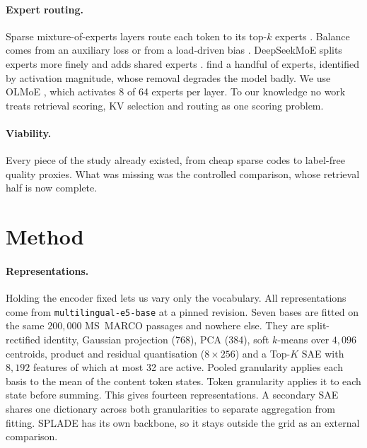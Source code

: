 \documentclass[11pt]{article}
\begin{document}
\paragraph{Expert routing.} Sparse mixture-of-experts layers route each token to its top-$k$
experts \citep{shazeer2017moe,lepikhin2021gshard,fedus2022switch}. Balance comes from an
auxiliary loss \citep{zoph2022stmoe} or from a load-driven bias \citep{wang2024lossfree}.
DeepSeekMoE splits experts more finely and adds shared experts \citep{dai2024deepseekmoe}.
\citet{su2026superexperts} find a handful of experts, identified by activation magnitude,
whose removal degrades the model badly. We use OLMoE \citep{muennighoff2025olmoe}, which
activates 8 of 64 experts per layer. To our knowledge no work treats retrieval scoring,
KV selection and routing as one scoring problem.

\paragraph{Viability.} Every piece of the study already existed, from cheap sparse codes
to label-free quality proxies. What was missing was the controlled comparison, whose
retrieval half is now complete.

\section{Method}
\label{sec:method}

\paragraph{Representations.} Holding the encoder fixed lets us vary only the vocabulary.
All representations come from \texttt{multilingual-e5-base} \citep{wang2024me5} at a
pinned revision. Seven bases are fitted on the same $200{,}000$ MS~MARCO passages
\citep{bajaj2016msmarco} and nowhere else. They are split-rectified identity, Gaussian
projection (768), PCA (384), soft $k$-means over $4{,}096$ centroids, product and residual
quantisation ($8 \times 256$) and a Top-$K$ SAE with $8{,}192$ features of which at most 32
are active. Pooled granularity applies each basis to the mean of the content token
states. Token granularity applies it to each state before summing. This gives fourteen
representations. A secondary SAE shares one dictionary across both granularities to
separate aggregation from fitting. SPLADE has its own backbone, so it stays outside the
grid as an external comparison.
\end{document}
